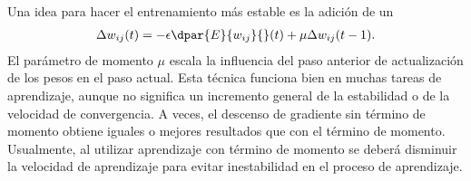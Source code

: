 Una idea para hacer el entrenamiento más estable es la adición de un
%
\begin{align}\label{mlp8}
  \Delta w_{ij}(t) = - \epsilon \dpar{E}{w_{ij}}{}(t)
    + \mu \Delta w_{ij}(t-1).
\end{align}
%
El parámetro de momento $\mu$ escala la influencia del paso anterior
de actualización de los pesos en el paso actual. Esta técnica funciona
bien en muchas tareas de aprendizaje, aunque no significa un
incremento general de la estabilidad o de la velocidad de
convergencia.  A veces, el descenso de gradiente sin término de
momento obtiene iguales o mejores resultados que con el término de
momento. Usualmente, al utilizar aprendizaje con término de momento se
deberá disminuir la velocidad de aprendizaje para evitar inestabilidad
en el proceso de aprendizaje.

